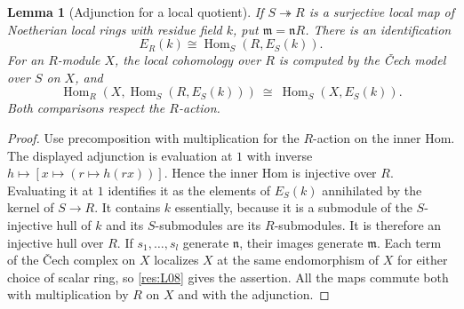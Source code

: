 \documentclass[11pt,oneside,openany]{book}
\newtheorem{lemma}[theorem]{Lemma}
\theoremstyle{definition}
\theoremstyle{remark}
\begin{document}
\begin{lemma}[Adjunction for a local quotient]\label{res:D04}
If $S\twoheadrightarrow R$ is a surjective local map of Noetherian
local rings with residue field $k$, put $\mathfrak m=\mathfrak nR$.
There is an identification
\[
 E_R(k)\cong\operatorname{Hom}_S(R,E_S(k)).
\]
For an $R$-module $X$, the local cohomology over $R$ is computed by
the \v{C}ech model over $S$ on $X$, and
\[
 \operatorname{Hom}_R(X,\operatorname{Hom}_S(R,E_S(k)))
   \ \cong\ \operatorname{Hom}_S(X,E_S(k)).
\]
Both comparisons respect the $R$-action.
\end{lemma}
\begin{proof}
Use precomposition with multiplication for the $R$-action on the
inner Hom. The displayed adjunction is evaluation at $1$ with
inverse $h\mapsto [x\mapsto (r\mapsto h(rx))]$. Hence the inner Hom
is injective over $R$. Evaluating it at $1$ identifies it as the
elements of $E_S(k)$ annihilated by the kernel of $S\to R$.
It contains $k$ essentially, because it is a submodule of the
$S$-injective hull of $k$ and its $S$-submodules are its
$R$-submodules. It is therefore an injective hull over $R$.
If $s_1,\ldots,s_l$ generate $\mathfrak n$, their images generate
$\mathfrak m$. Each term of the \v{C}ech complex on $X$
localizes $X$ at the same endomorphism of $X$ for either choice
of scalar ring, so \ref{res:L08} gives the assertion. All the
maps commute both with multiplication by $R$ on $X$ and with
the adjunction.
\end{proof}
\end{document}
